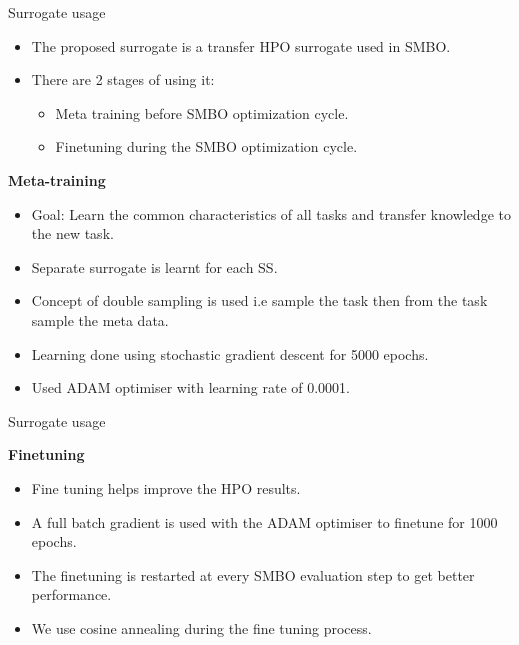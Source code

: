 \documentclass{beamer}
\begin{document}
\begin{frame}[t]{Surrogate usage}

\begin{itemize}
\item The proposed surrogate is a transfer HPO surrogate used in SMBO.
\item There are 2 stages of using it:
\begin{itemize}
\item Meta training before SMBO optimization cycle.
\item Finetuning during the SMBO optimization cycle.
\end{itemize}
\end{itemize}

\textbf{Meta-training}
\begin{itemize}
\item Goal: Learn the common characteristics of all tasks and transfer knowledge to the new task.
\item Separate surrogate is learnt for each SS.
\item Concept of double sampling is used i.e sample the task then from the task sample the meta data.
\item Learning done using stochastic gradient descent for 5000 epochs.
\item Used ADAM optimiser with learning rate of 0.0001. 
\end{itemize}

\end{frame}


\begin{frame}[t]{Surrogate usage}

\textbf{Finetuning}
\begin{itemize}
\item Fine tuning helps improve the HPO results.
\item A full batch gradient is used with the ADAM optimiser to finetune for 1000 epochs.
\item The finetuning is restarted at every SMBO evaluation step to get better performance.
\item We use cosine annealing during the fine tuning process.
\end{itemize}

\end{frame}
\end{document}
